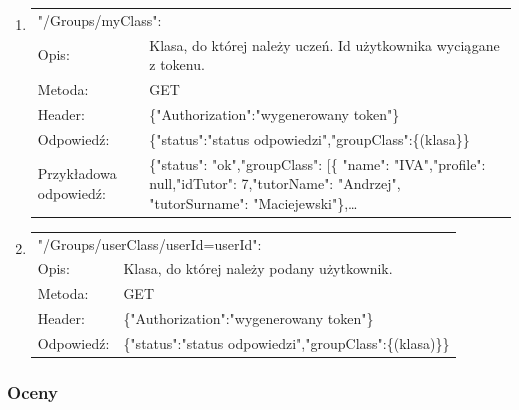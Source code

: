 \documentclass[12pt, titlepage]{article}
\begin{document}
\begin{enumerate}
	\item 
	{\renewcommand{\arraystretch}{1.5}
	\begin{tabular}[t]{p{3cm} p{15cm}}
	\multicolumn{2}{l}{"/Groups/myClass":} \\
	Opis: &  Klasa, do której należy uczeń. \newline Id użytkownika wyciągane z tokenu.\\
	Metoda: & GET \\
	Header: & \{"Authorization":"wygenerowany token"\} \\
	Odpowiedź: & \{"status":"status odpowiedzi",\newline "groupClass":\{(klasa\}\} \\
	Przykładowa \newline odpowiedź: & 			\{"status": "ok",\newline "groupClass": [\newline \{ "name": "IVA",\newline "profile": null,\newline "idTutor": 7,\newline "tutorName": "Andrzej", \newline "tutorSurname": "Maciejewski"\},\newline \ldots
	\end{tabular}}
	
	\item 
	{\renewcommand{\arraystretch}{1.5}
	\begin{tabular}[t]{p{3cm} p{15cm}}
	\multicolumn{2}{l}{"/Groups/userClass/userId={userId}":} \\
	Opis: &  Klasa, do której należy podany użytkownik. \\
	Metoda: & GET \\
	Header: & \{"Authorization":"wygenerowany token"\} \\
	Odpowiedź: & \{"status":"status odpowiedzi",\newline "groupClass":\{(klasa)\}\}
	\end{tabular}}
\end{enumerate}


\subsubsection{Oceny}
\end{document}
